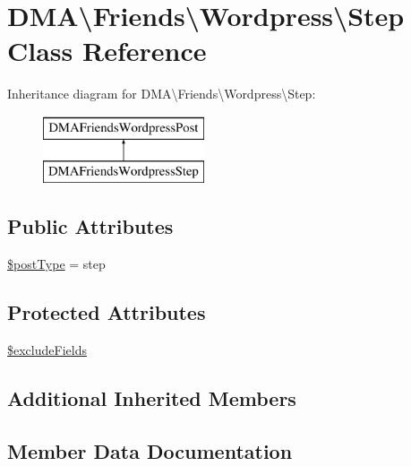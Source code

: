 \hypertarget{classDMA_1_1Friends_1_1Wordpress_1_1Step}{}\section{D\+M\+A\textbackslash{}Friends\textbackslash{}Wordpress\textbackslash{}Step Class Reference}
\label{classDMA_1_1Friends_1_1Wordpress_1_1Step}
Inheritance diagram for D\+M\+A\textbackslash{}Friends\textbackslash{}Wordpress\textbackslash{}Step\+:\begin{figure}[H]
\begin{center}
\leavevmode
\includegraphics[height=2.000000cm]{d0/d87/classDMA_1_1Friends_1_1Wordpress_1_1Step}
\end{center}
\end{figure}
\subsection*{Public Attributes}
\begin{DoxyCompactItemize}
\item 
\hyperlink{classDMA_1_1Friends_1_1Wordpress_1_1Step_abaa142e178d837a810e5048af7f36497}{\$post\+Type} = \textquotesingle{}step\textquotesingle{}
\end{DoxyCompactItemize}
\subsection*{Protected Attributes}
\begin{DoxyCompactItemize}
\item 
\hyperlink{classDMA_1_1Friends_1_1Wordpress_1_1Step_aa320e2b0f3f4a24c3cea41e133fd1145}{\$exclude\+Fields}
\end{DoxyCompactItemize}
\subsection*{Additional Inherited Members}


\subsection{Member Data Documentation}
\hypertarget{classDMA_1_1Friends_1_1Wordpress_1_1Step_aa320e2b0f3f4a24c3cea41e133fd1145}{}
